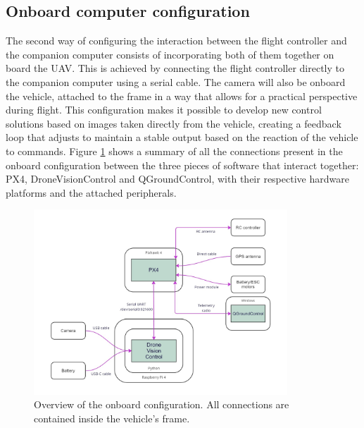 \subsection{Onboard computer configuration}
\label{subsec:onboard}

The second way of configuring the interaction between the flight controller and the companion computer consists of incorporating both of them together on board the UAV.
This is achieved by connecting the flight controller directly to the companion computer using a serial cable.
The camera will also be onboard the vehicle, attached to the frame in a way that allows for a practical perspective during flight.
This configuration makes it possible to develop new control solutions based on images taken directly from the vehicle, creating a feedback loop that adjusts to maintain a stable output based on the reaction of the vehicle to commands.
Figure \ref{fig:onboard-config} shows a summary of all the connections present in the onboard configuration between the three pieces of software that interact together: PX4, DroneVisionControl and QGroundControl, with their respective hardware platforms and the attached peripherals.

\begin{figure}[b!]
  \centering
  \includegraphics[width=0.85\textwidth,keepaspectratio]{img/onboard-diagram.jpg}
  \caption{Overview of the onboard configuration. All connections are contained inside the vehicle's frame.}
  \label{fig:onboard-config}
\end{figure}


